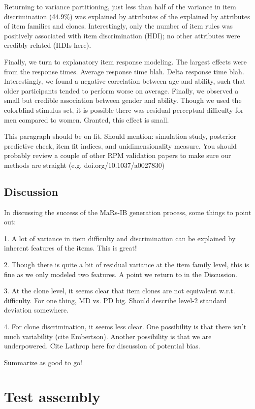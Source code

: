 \documentclass[a4paper,man,natbib]{apa6}
\begin{document}
Returning to variance partitioning, just less than half of the variance in item discrimination (44.9\%) was explained by attributes of the explained by attributes of item families and clones. Interestingly, only the number of item rules was positively associated with item discrimination (HDI); no other attributes were credibly related (HDIs here). 

Finally, we turn to explanatory item response modeling. The largest effects were from the response times. Average response time blah. Delta response time blah. Interestingly, we found a negative correlation between age and ability, such that older participants tended to perform worse on average. Finally, we observed a small but credible association between gender and ability. Though we used the colorblind stimulus set, it is possible there was residual perceptual difficulty for men compared to women. Granted, this effect is small.

This paragraph should be on fit. Should mention: simulation study, posterior predictive check, item fit indices, and unidimensionality measure. You should probably review a couple of other RPM validation papers to make sure our methods are straight (e.g. doi.org/10.1037/a0027830)

\subsection{Discussion}

In discussing the success of the MaRs-IB generation process, some things to point out:

1. A lot of variance in item difficulty and discrimination can be explained by inherent features of the items. This is great!

2. Though there is quite a bit of residual variance at the item family level, this is fine as we only modeled two features. A point we return to in the Discussion.

3. At the clone level, it seems clear that item clones are not equivalent w.r.t. difficulty. For one thing, MD vs. PD big. Should describe level-2 standard deviation somewhere. 

4. For clone discrimination, it seems less clear. One possibility is that there isn't much variability (cite Embertson). Another possibility is that we are underpowered. Cite Lathrop here for discussion of potential bias.

Summarize as good to go!

\section{Test assembly}
\end{document}
